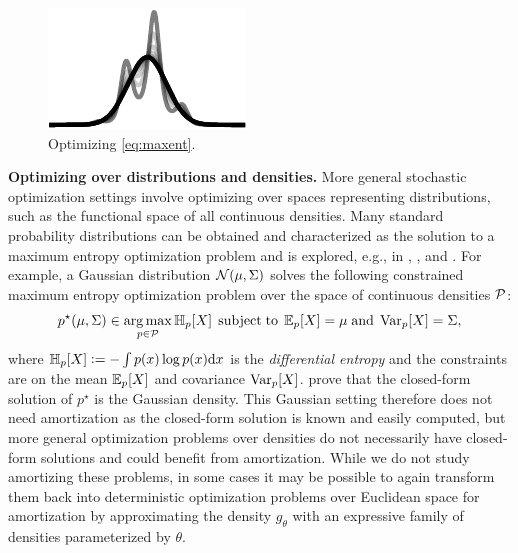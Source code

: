 \documentclass[twoside,11pt]{article}
\newcommand{\eg}{e.g.\xspace}
\begin{document}
\begin{figure}
\includegraphics[width=\linewidth]{fig/maxent.pdf}
\caption{Optimizing \cref{eq:maxent}.}
\end{figure}
\textbf{Optimizing over distributions and densities.}
More general stochastic optimization settings involve optimizing over
spaces representing distributions, such as the functional space
of all continuous densities.
Many standard probability distributions can be obtained and
characterized as the solution to a maximum entropy
optimization problem and is explored, \eg, in
\citet[Ch.~12]{cover2006elements},
\citet[p.~47]{guiasu1985principle}, and
\citet[\S6.2]{pennec2006intrinsic}.
For example, a Gaussian distribution ${\mathcal{N}}(\mu, \Sigma)$
solves the following constrained maximum entropy
optimization problem over the space of continuous densities ${\mathcal{P}}$:
\begin{equation}
  p^\star(\mu, \Sigma)\in \operatorname*{arg\,max}_{p\in{\mathcal{P}}} \operatorname{\mathbb{H}}_p[X]\; \operatorname*{subject\;to}\; \operatorname{\mathbb{E}}_p[X] = \mu\; {\rm and}\; \operatorname{\rm{Var}}_p[X] = \Sigma,
  \label{eq:maxent}
\end{equation}
where $\operatorname{\mathbb{H}}_p[X]\vcentcolon= -\int p(x)\log p(x){\rm d}x$ is the \emph{differential entropy}
and the constraints are on the mean $\operatorname{\mathbb{E}}_p[X]$ and covariance $\operatorname{\rm{Var}}_p[X]$.
\citet[Theorem~8.6.5 and Example~12.2.8]{cover2006elements} prove that the closed-form solution
of $p^\star$ is the Gaussian density.
This Gaussian setting therefore does not need amortization as the
closed-form solution is known and easily computed, but
more general optimization problems over densities do not necessarily
have closed-form solutions and could benefit from amortization.
While we do not study amortizing these problems, in some cases it may
be possible to again transform them back into deterministic optimization problems
over Euclidean space for amortization by approximating the density $g_\theta$
with an expressive family of densities parameterized by $\theta$.
\end{document}
